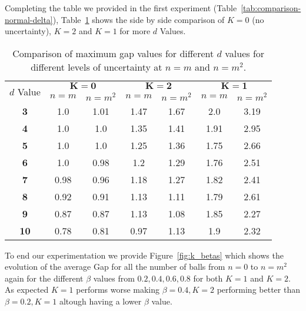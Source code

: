 \documentclass[a4paper, 11pt]{article}
\begin{document}
Completing the table we provided in the first experiment (Table~\ref{tab:comparison-normal-delta}), Table~\ref{tab:comparison-k-delta} shows the side by side comparison of $K=0$ (no uncertainty), $K=2$ and $K=1$ for more $d$ Values.

\begin{table}[H]
    \centering
    \begin{tabular}{|c||cc|cc|cc|}
        \hline
        \multirow{2}{*}{$d$ Value} & \multicolumn{2}{c|}{$\mathbf{K=0}$} & \multicolumn{2}{c|}{$\mathbf{K=2}$} & \multicolumn{2}{c|}{$\mathbf{K=1}$} \\ \cline{2-7}
        & $n = m$ & $n = m^2$ & $n = m$ & $n = m^2$ & $n = m$ & $n = m^2$ \\ \hline
        \textbf{3} & 1.0 & 1.01   & 1.47 & 1.67 & 2.0 & 3.19 \\ \hline
        \textbf{4} & 1.0 & 1.0   & 1.35 & 1.41   & 1.91 & 2.95 \\ \hline
        \textbf{5} & 1.0 & 1.0    & 1.25 & 1.36   & 1.75 & 2.66  \\ \hline
        \textbf{6} & 1.0 & 0.98   & 1.2 & 1.29   & 1.76 & 2.51 \\ \hline
        \textbf{7} & 0.98 & 0.96  & 1.18 & 1.27   & 1.82 & 2.41 \\ \hline
        \textbf{8} & 0.92 & 0.91  & 1.13 & 1.11   & 1.79 & 2.61 \\ \hline
        \textbf{9} & 0.87 & 0.87  & 1.13 & 1.08  & 1.85 & 2.27 \\ \hline
        \textbf{10} & 0.78 & 0.81 & 0.97 & 1.13  & 1.9 & 2.32 \\ \hline
    \end{tabular}
    \caption{Comparison of maximum gap values for different $d$ values for different levels of uncertainty at $n = m$ and $n = m^2$.}
    \label{tab:comparison-k-delta}
\end{table}
\vspace{-1em}
To end our experimentation we provide Figure~\ref{fig:k_betas} which shows the evolution of the average Gap for all the number of balls from $n=0$ to $n=m^2$ again for the different \(\beta\) values from $0.2, 0.4, 0.6, 0.8$ for both $K=1$ and $K=2$. As expected $K=1$ performs worse making \(\beta=0.4, K=2\) performing better than \(\beta=0.2, K=1\) altough having a lower \(\beta\) value.
\end{document}
